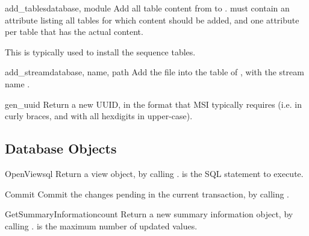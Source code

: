 \begin{funcdesc}{add_tables}{database, module}
  Add all table content from  to .
   must contain an attribute 
  listing all tables for which content should be added,
  and one attribute per table that has the actual content.

  This is typically used to install the sequence tables.
\end{funcdesc}

\begin{funcdesc}{add_stream}{database, name, path}
  Add the file  into the  table
  of , with the stream name .
\end{funcdesc}

\begin{funcdesc}{gen_uuid}{}
  Return a new UUID, in the format that MSI typically
  requires (i.e. in curly braces, and with all hexdigits
  in upper-case).
\end{funcdesc}

\begin{seealso}
\end{seealso}

\subsection{Database Objects\label{database-objects}}

\begin{methoddesc}[Database]{OpenView}{sql}
  Return a view object, by calling .
   is the SQL statement to execute.
\end{methoddesc}

\begin{methoddesc}[Database]{Commit}{}
  Commit the changes pending in the current transaction,
  by calling .
\end{methoddesc}

\begin{methoddesc}[Database]{GetSummaryInformation}{count}
  Return a new summary information object, by calling
  .   is the maximum number of
  updated values.
\end{methoddesc}


